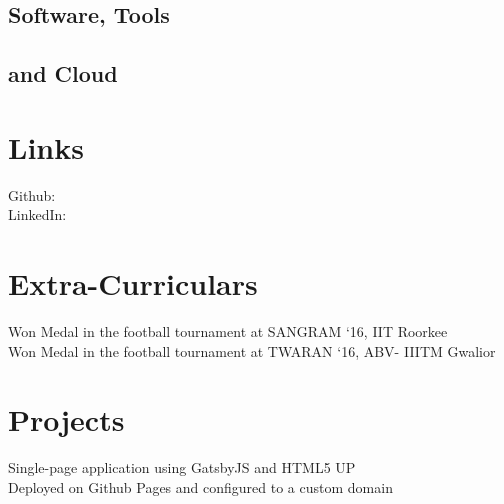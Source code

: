 \documentclass[]{resume}
\begin{document}
\begin{minipage}[t]{0.33\textwidth}
\sectionsep

\subsection{Software, Tools}
\subsection{and Cloud}
\sectionsep

\section{Links} 
Github:  \href{https://github.com/codery2k}{} \\
LinkedIn:  \href{https://www.linkedin.com/in/saurabh-miglani/}{} \\
\sectionsep

\section{Extra-Curriculars} 
Won  Medal in the football tournament at SANGRAM ‘16, IIT Roorkee \\
Won  Medal in the football tournament at TWARAN ‘16, ABV- IIITM Gwalior

\sectionsep



\section{Projects}

Single-page application using GatsbyJS and HTML5 UP 
\\ Deployed on Github Pages and configured to a custom domain


\end{minipage}
\end{document}
